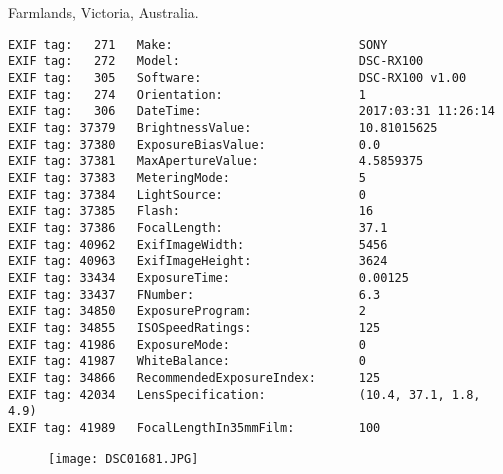 \section{\protect{}}
\noindent Farmlands, Victoria, Australia.
\noindent
\begin{lstlisting}
EXIF tag:   271   Make:                          SONY
EXIF tag:   272   Model:                         DSC-RX100
EXIF tag:   305   Software:                      DSC-RX100 v1.00
EXIF tag:   274   Orientation:                   1
EXIF tag:   306   DateTime:                      2017:03:31 11:26:14
EXIF tag: 37379   BrightnessValue:               10.81015625
EXIF tag: 37380   ExposureBiasValue:             0.0
EXIF tag: 37381   MaxApertureValue:              4.5859375
EXIF tag: 37383   MeteringMode:                  5
EXIF tag: 37384   LightSource:                   0
EXIF tag: 37385   Flash:                         16
EXIF tag: 37386   FocalLength:                   37.1
EXIF tag: 40962   ExifImageWidth:                5456
EXIF tag: 40963   ExifImageHeight:               3624
EXIF tag: 33434   ExposureTime:                  0.00125
EXIF tag: 33437   FNumber:                       6.3
EXIF tag: 34850   ExposureProgram:               2
EXIF tag: 34855   ISOSpeedRatings:               125
EXIF tag: 41986   ExposureMode:                  0
EXIF tag: 41987   WhiteBalance:                  0
EXIF tag: 34866   RecommendedExposureIndex:      125
EXIF tag: 42034   LensSpecification:             (10.4, 37.1, 1.8, 4.9)
EXIF tag: 41989   FocalLengthIn35mmFilm:         100

\end{lstlisting}
\clearpage
\begin{figure}
\raggedleft
\texttt{[image: DSC01681.JPG]}
\end{figure}


\clearpage
